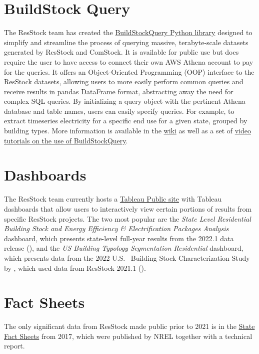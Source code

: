 \section{BuildStock Query}
The ResStock team has created the \href{https://github.com/NatLabRockies/buildstock-query/}{BuildStockQuery Python library} designed to simplify and streamline the process of querying massive, terabyte-scale datasets generated by ResStock and ComStock. It is available for public use but does require the user to have access to connect their own AWS Athena account to pay for the queries. It offers an Object-Oriented Programming (OOP) interface to the ResStock  datasets, allowing users to more easily perform common queries and receive results in pandas DataFrame format, abstracting away the need for complex SQL queries. By initializing a query object with the pertinent Athena database and table names, users can easily specify queries. For example, to extract timeseries electricity for a specific end use for a given state, grouped by building types. More information is available in the \href{ https://github.com/NatLabRockies/buildstock-query/wiki}{wiki} as well as a set of \href{https://www.youtube.com/watch?v=jmmAHsOZAp8&list=PLmIn8Hncs7bEYCZiHaoPSovoBrRGR-tRS&index=8}{video tutorials on the use of BuildStockQuery}.

\section{Dashboards}
The ResStock team currently hosts a \href{https://public.tableau.com/app/profile/nrel.buildingstock/vizzes}{Tableau Public site} with Tableau dashboards that allow users to interactively view certain portions of results from specific ResStock projects. The two most popular are the \textit{State Level Residential Building Stock and Energy Efficiency \& Electrification Packages Analysis} dashboard, which presents state-level full-year results from the 2022.1 data release (\cite{Present2022}), and the \textit{US Building Typology Segmentation Residential} dashboard, which presents data from the 2022 U.S.~ Building Stock Characterization Study by \citet{Reyna2022}, which used data from ResStock 2021.1 (\cite{Wilson2022}). 

\section{Fact Sheets}
The only significant data from ResStock made public prior to 2021 is in the \href{https://resstock.nlr.gov/factsheets/}{State Fact Sheets} from 2017, which were published by NREL together with a technical report. 

